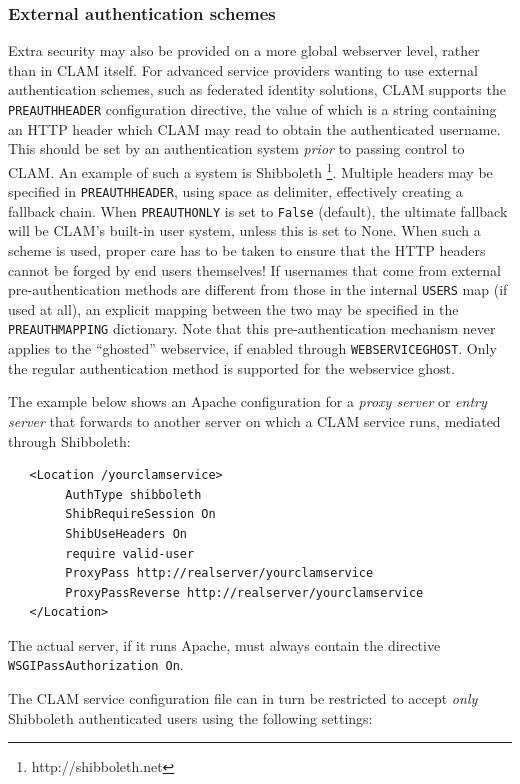 \documentclass[a4paper,12pt,twoside,openright]{report}
\begin{document}
\subsubsection{External authentication schemes}

Extra security may also be provided on a more global webserver level, rather
than in CLAM itself. For advanced service providers wanting to use external
authentication schemes, such as federated identity solutions, CLAM supports the
\texttt{PREAUTHHEADER} configuration directive, the value of which is a string
containing an HTTP header which CLAM may read to obtain the authenticated
username. This should be set by an authentication system \emph{prior} to
passing control to CLAM. An example of such a system is Shibboleth
\footnote{http://shibboleth.net}.  Multiple headers may be specified in
\texttt{PREAUTHHEADER}, using space as delimiter, effectively creating a
fallback chain. When \texttt{PREAUTHONLY} is set to \texttt{False} (default),
the ultimate fallback will be CLAM's built-in user system, unless this is set
to None. When such a scheme is used, proper care has to be taken to ensure that
the HTTP headers cannot be forged by end users themselves! If usernames that
come from external pre-authentication methods are different from those in the
internal \texttt{USERS} map (if used at all), an explicit mapping between
the two may be specified in the \texttt{PREAUTHMAPPING} dictionary. Note that
this pre-authentication mechanism never applies to the ``ghosted'' webservice,
if enabled through \texttt{WEBSERVICEGHOST}. Only the regular authentication
method is supported for the webservice ghost.

The example below shows an Apache configuration for a \emph{proxy server} or
\emph{entry server} that forwards to another server on which a CLAM service runs, mediated
through Shibboleth:

{ \small
\begin{verbatim}
   <Location /yourclamservice>
        AuthType shibboleth
        ShibRequireSession On
        ShibUseHeaders On
        require valid-user
        ProxyPass http://realserver/yourclamservice
        ProxyPassReverse http://realserver/yourclamservice
   </Location>
\end{verbatim}
}

The actual server, if it runs Apache, must always contain the directive \\
\texttt{WSGIPassAuthorization On}.

The CLAM service configuration file can in turn be restricted to accept \emph{only}
Shibboleth authenticated users using the following settings:
\end{document}

